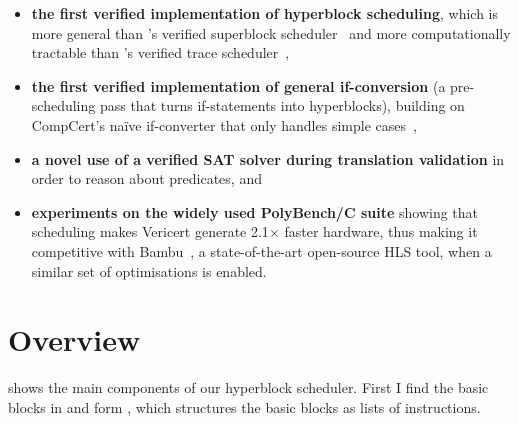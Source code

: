\begin{itemize}
\item \textbf{the first verified implementation of hyperblock scheduling}, which
  is more general than \citeauthor{six22_formal_verif_super_sched}'s verified
  superblock scheduler~\cite{six22_formal_verif_super_sched} and more
  computationally tractable than
  \citeauthor{tristan08_formal_verif_trans_valid}'s verified trace
  scheduler~\cite{tristan08_formal_verif_trans_valid},
\item \textbf{the first verified implementation of general if-conversion} (a
  pre-scheduling pass that turns if-statements into hyperblocks), building on
  CompCert's na\"ive if-converter that only handles simple
  cases~\cite{absint19_compc},
\item \textbf{a novel use of a verified SAT solver during translation
    validation} in order to reason about predicates, and
\item \textbf{experiments on the widely used PolyBench/C suite} showing that
  scheduling makes Vericert generate 2.1$\times$ faster hardware, thus making it
  competitive with Bambu~\cite{ferrandi21_bambu}, a state-of-the-art
  open-source HLS tool, when a similar set of optimisations is enabled.
\end{itemize}

\section{Overview}
\label{sec:hs:overview}

 shows the main components of our hyperblock
scheduler.  First I find the basic blocks in \rtl{} and form \rtlblock{}, which
structures the basic blocks as lists of instructions.

